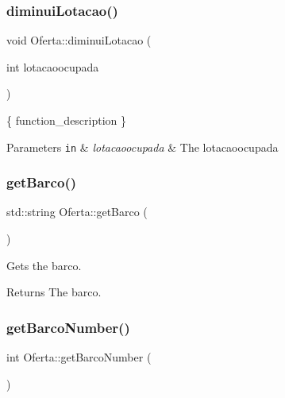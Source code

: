 \subsubsection{\texorpdfstring{diminui\+Lotacao()}{diminuiLotacao()}}
{\footnotesize\ttfamily void Oferta\+::diminui\+Lotacao (\begin{DoxyParamCaption}\item[{int}]{lotacaoocupada }\end{DoxyParamCaption})\hspace{0.3cm}{\ttfamily [inline]}}



\{ function\+\_\+description \} 


\begin{DoxyParams}[1]{Parameters}
\mbox{\tt in}  & {\em lotacaoocupada} & The lotacaoocupada \\
\hline
\end{DoxyParams}
\mbox{\label{classOferta_aaed9b5937f9f33d2980fcc13ac02132c}} 
\subsubsection{\texorpdfstring{get\+Barco()}{getBarco()}}
{\footnotesize\ttfamily std\+::string Oferta\+::get\+Barco (\begin{DoxyParamCaption}{ }\end{DoxyParamCaption})\hspace{0.3cm}{\ttfamily [inline]}}



Gets the barco. 

\begin{DoxyReturn}{Returns}
The barco. 
\end{DoxyReturn}
\mbox{\label{classOferta_abf0f062fa730edf6d4232926980b106c}} 
\subsubsection{\texorpdfstring{get\+Barco\+Number()}{getBarcoNumber()}}
{\footnotesize\ttfamily int Oferta\+::get\+Barco\+Number (\begin{DoxyParamCaption}{ }\end{DoxyParamCaption})}



